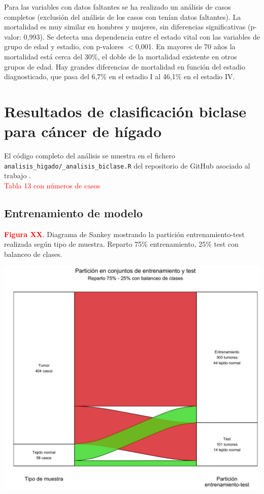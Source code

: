 Para las variables con datos faltantes se ha realizado un análisis de casos completos (exclusión del análisis de los casos con tenían datos faltantes).  La mortalidad es muy similar en hombres y mujeres, sin diferencias significativas (p-valor: 0,993). Se detecta una dependencia entre el estado vital con las variables de grupo de edad y estadio, con p-valores $<$0,001. En mayores de 70 años la mortalidad está cerca del 30\%, el doble de la mortalidad existente en otros grupos de edad. Hay grandes diferencias de mortalidad en función del estadio diagnosticado, que pasa del 6,7\% en el estadio I al 46,1\% en el estadio IV.

\section{Resultados de clasificación biclase para cáncer de hígado}

El código completo del análisis se muestra en el fichero \texttt{analisis\_higado/\_analisis\_biclase.R} del repositorio de GitHub asociado al trabajo \cite{Redondo-Sanchez2020}.\\

\textcolor{red}{Tabla 13 con números de casos}

\subsection{Entrenamiento de modelo}

\newpage
\textbf{\textcolor{red}{Figura XX}}. Diagrama de Sankey mostrando la partición entrenamiento-test realizada según tipo de muestra. Reparto 75\% entrenamiento, 25\% test con balanceo de clases.
\begin{center}
	\includegraphics[width=1\textwidth]{figuras/higado_biclase_sankey.png} \\
\end{center}

